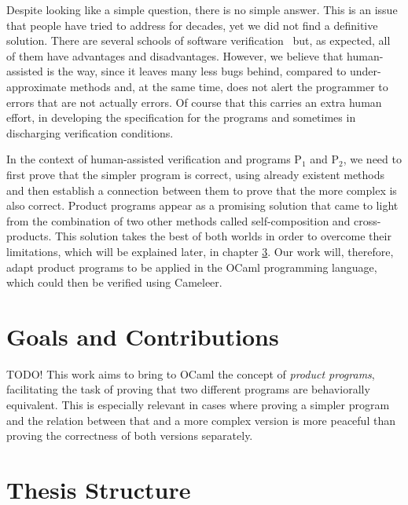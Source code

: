 Despite looking like a simple question, there is no simple answer.
This is an issue that people have tried to address for decades, yet we did not find a definitive solution.
There are several schools of software verification~\cite{DBLP:conf/fm/BrainP24} but, as expected, all of them have advantages and disadvantages.
However, we believe that human-assisted is the way, since it leaves many less bugs behind, compared to under-approximate methods and, at the same time, does not alert the programmer to errors that are not actually errors.
Of course that this carries an extra human effort, in developing the specification for the programs and sometimes in discharging verification conditions.

In the context of human-assisted verification and programs P$_1$ and P$_2$, we need to first prove that the simpler program is correct, using already existent methods and then establish a connection between them to prove that the more complex is also correct.
Product programs appear as a promising solution that came to light from the combination of two other methods called self-composition and cross-products.
This solution takes the best of both worlds in order to overcome their limitations, which will be explained later, in chapter \hyperref[cha:state_of_the_art]{3}.
Our work will, therefore, adapt product programs to be applied in the OCaml programming language, which could then be verified using Cameleer.


\section{Goals and Contributions}

TODO!
This work aims to bring to OCaml the concept of \emph{product programs}, facilitating the task of proving that two different programs are behaviorally equivalent.
This is especially relevant in cases where proving a simpler program and the relation between that and a more complex version is more peaceful than proving the correctness of both versions separately.


\section{Thesis Structure}

